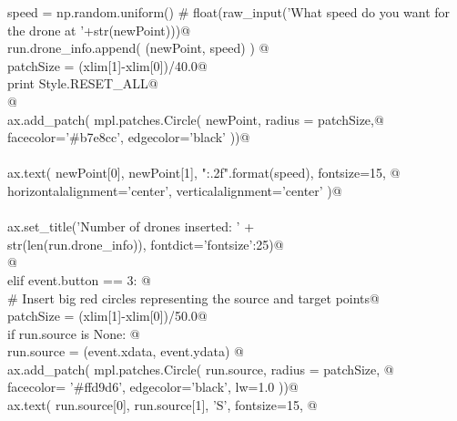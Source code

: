 \documentclass[10pt, english, oneside]{report}
\begin{document}
\begin{appendices}
\begin{flushleft}
\begin{list}{}{}
\mbox{}\verb@                 speed    = np.random.uniform() # float(raw_input('What speed do you want for the drone at '+str(newPoint)))@\\
\mbox{}\verb@                 run.drone_info.append( (newPoint, speed) ) @\\
\mbox{}\verb@                 patchSize  = (xlim[1]-xlim[0])/40.0@\\
\mbox{}\verb@                 print Style.RESET_ALL@\\
\mbox{}\verb@                 @\\
\mbox{}\verb@                 ax.add_patch( mpl.patches.Circle( newPoint, radius = patchSize,@\\
\mbox{}\verb@                                                   facecolor='#b7e8cc', edgecolor='black'  ))@\\
\mbox{}\verb@@\\
\mbox{}\verb@                 ax.text( newPoint[0], newPoint[1], "{:.2f}".format(speed), fontsize=15, @\\
\mbox{}\verb@                          horizontalalignment='center', verticalalignment='center' )@\\
\mbox{}\verb@@\\
\mbox{}\verb@                 ax.set_title('Number of drones inserted: ' +\@\\
\mbox{}\verb@                              str(len(run.drone_info)), fontdict={'fontsize':25})@\\
\mbox{}\verb@                 @\\
\mbox{}\verb@             elif event.button == 3:  @\\
\mbox{}\verb@                 # Insert big red circles representing the source and target points@\\
\mbox{}\verb@                 patchSize  = (xlim[1]-xlim[0])/50.0@\\
\mbox{}\verb@                 if run.source is None:    @\\
\mbox{}\verb@                      run.source = (event.xdata, event.ydata)  @\\
\mbox{}\verb@                      ax.add_patch( mpl.patches.Circle( run.source, radius = patchSize, @\\
\mbox{}\verb@                                                        facecolor= '#ffd9d6', edgecolor='black', lw=1.0 ))@\\
\mbox{}\verb@                      ax.text( run.source[0], run.source[1], 'S', fontsize=15, @\\

\end{list}
\end{flushleft}
\end{appendices}
\end{document}
